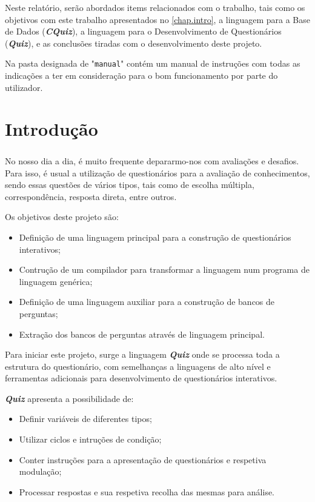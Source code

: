 \documentclass{report}
\begin{document}
Neste relatório, serão abordados items relacionados com o trabalho, tais como os objetivos com este trabalho apresentados no \autoref{chap.intro}, a linguagem para a Base de Dados (\textbf{\textit{CQuiz}}), a linguagem para o Desenvolvimento de Questionários (\textbf{\textit{Quiz}}), e as conclusões tiradas com o desenvolvimento deste projeto.

Na pasta designada de "\texttt{manual}" contém um manual de instruções com todas as indicações a ter em consideração para o bom funcionamento por parte do utilizador.



\chapter{Introdução}
\label{chap.intro}

\paragraph{ }
No nosso dia a dia, é muito frequente depararmo-nos com avaliações e desafios. Para isso, é usual a utilização de questionários para a avaliação de conhecimentos, sendo essas questões de vários tipos, tais como de escolha múltipla, correspondência, resposta direta, entre outros.

Os objetivos deste projeto são: 
\begin{itemize}
	\item Definição de uma linguagem principal para a construção de questionários interativos;
	\item Contrução de um compilador para transformar a linguagem num programa de linguagem genérica;
	\item Definição de uma linguagem auxiliar para a construção de bancos de perguntas;
	\item Extração dos bancos de perguntas através de linguagem principal.
\end{itemize}

Para iniciar este projeto, surge a linguagem \textbf{\textit{Quiz}} onde se processa toda a estrutura do questionário, com semelhanças a linguagens de alto nível e ferramentas adicionais para desenvolvimento de questionários interativos.

\textbf{\textit{Quiz}} apresenta a possibilidade de:
\begin{itemize}
	\item Definir variáveis de diferentes tipos;
	\item Utilizar ciclos e intruções de condição;
	\item Conter instruções para a apresentação de questionários e respetiva modulação;
	\item Processar respostas e sua respetiva recolha das mesmas para análise.
\end{itemize}
\end{document}
